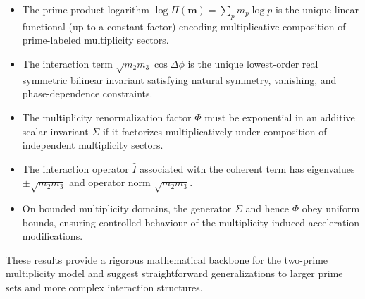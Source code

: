 \documentclass[11pt]{article}
\begin{document}
\begin{itemize}
\item The prime-product logarithm \(\log\Pi(\mathbf{m}) = \sum_p m_p\log p\) is the unique linear functional (up to a constant factor) encoding multiplicative composition of prime-labeled multiplicity sectors.
\item The interaction term \(\sqrt{m_2 m_3}\cos\Delta\phi\) is the unique lowest-order real symmetric bilinear invariant satisfying natural symmetry, vanishing, and phase-dependence constraints.
\item The multiplicity renormalization factor \(\Phi\) must be exponential in an additive scalar invariant \(\Sigma\) if it factorizes multiplicatively under composition of independent multiplicity sectors.
\item The interaction operator \(\hat{I}\) associated with the coherent term has eigenvalues \(\pm\sqrt{m_2 m_3}\) and operator norm \(\sqrt{m_2 m_3}\).
\item On bounded multiplicity domains, the generator \(\Sigma\) and hence \(\Phi\) obey uniform bounds, ensuring controlled behaviour of the multiplicity-induced acceleration modifications.
\end{itemize}

These results provide a rigorous mathematical backbone for the two-prime multiplicity model and suggest straightforward generalizations to larger prime sets and more complex interaction structures.

\nocite{*}


\end{document}
